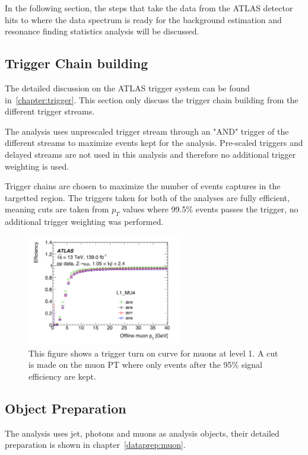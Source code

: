 In the following section, the steps that take the data from the ATLAS detector hits to where the data spectrum is ready for the background estimation and resonance finding statistics analysis will be discussed. 

\subsection{Trigger Chain building}
The detailed discussion on the ATLAS trigger system can be found in~\ref{chapter:trigger}. This section only discuss the trigger chain building from the different trigger streams. 

The analysis uses unprescaled trigger stream through an "AND" trigger of the different streams to maximize events kept for the analysis. Pre-scaled triggers and delayed streams are not used in this analysis and therefore no additional trigger weighting is used.

Trigger chains are chosen to maximize the number of events captures in the targetted region. The triggers taken for both of the analyses are fully efficient, meaning cuts are taken from $p_{T}$ values where 99.5\% events passes the trigger, no additional trigger weighting was performed. 

\begin{figure}[!htb]
    \begin{center}
        \includegraphics[width=0.6\textwidth]{figures/chapter_analysismethod/muonTrigger}
        \caption{
            This figure shows a trigger turn on curve for muons at level 1. A cut is made on the muon PT where only events after the 95\% signal efficiency are kept.
        }
        \label{fig:triggerturnon}
    \end{center}
\end{figure}



\subsection{Object Preparation}
The analysis uses jet, photons and muons as analysis objects, their detailed preparation is shown in chapter~\ref{dataprep:muon}.    

